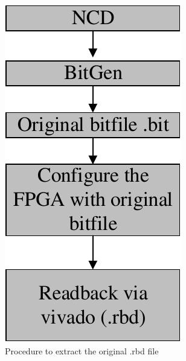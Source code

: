 \begin{figure}[tb!]
 \centering
  \captionsetup{justification=centering}    
   \includegraphics[scale = 0.5]{Figures/original-rbd.pdf}
   \caption{Procedure to extract the original .rbd file}
\label{fig:original-rbd}
\end{figure}

